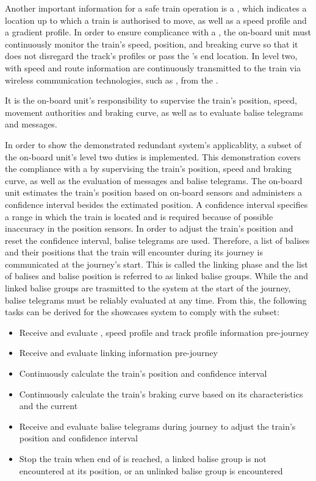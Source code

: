 Another important information for a safe train operation is a , which indicates a location up to which a train is authorised to move, as well as a speed profile and a gradient profile.
In order to ensure complicance with a , the on-board unit must continuously monitor the train's speed, position, and breaking curve so that it does not disregard the track's profiles or pass the 's end location.
In  level two,  with speed and route information are continuously transmitted to the train via wireless communication technologies, such as , from the .

It is the on-board unit's responsibility to supervise the train's position, speed, movement authorities and braking curve, as well as to evaluate balise telegrams and  messages.


In order to show the demonstrated redundant system's applicablity, a subset of the on-board unit's  level two duties is implemented.
This demonstration covers the compliance with a  by supervising the train's position, speed and braking curve, as well as the evaluation of  messages and balise telegrams.
The on-board unit estimates the train's position based on on-board sensors and administers a confidence interval besides the extimated position.
A confidence interval specifies a range in which the train is located and is required because of possible inaccuracy in the position sensors.
In order to adjust the train's position and reset the confidence interval, balise telegrams are used.
Therefore, a list of balises and their positions that the train will encounter during its journey is communicated at the journey's start.
This is called the linking phase and the list of balises and balise position is referred to as linked balise groups.
While the  and linked balise groups are trasmitted to the system at the start of the journey, balise telegrams must be reliably evaluated at any time.
From this, the following tasks can be derived for the showcases system to comply with the  subset:

\begin{itemize}
\item Receive and evaluate , speed profile and track profile information pre-journey
\item Receive and evaluate linking information pre-journey
\item Continuously calculate the train's position and confidence interval
\item Continuously calculate the train's braking curve based on its characteristics and the current 
\item Receive and evaluate balise telegrams during journey to adjust the train's position and confidence interval
\item Stop the train when end of  is reached, a linked balise group is not encountered at its position, or an unlinked balise group is encountered
\end{itemize}


